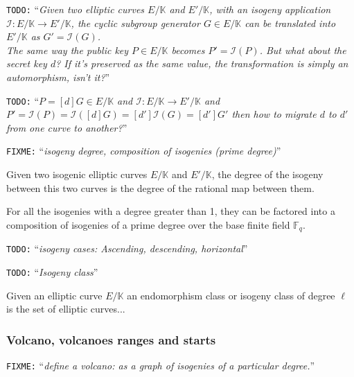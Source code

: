 \documentclass[10pt,a4paper,twoside]{llncs}
\newcommand{\todo}[1]{\texttt{\color{red}TODO:} ``\emph{#1}''}
\newcommand{\fixme}[1]{\texttt{\color{red}FIXME:} ``\emph{#1}''}
\newcommand{\Fq}{\ensuremath{\mathbb{F}_q}}%
\begin{document}
\todo{Given two elliptic curves $E/\mathbb{K}$ and $E'/\mathbb{K}$, with an isogeny application $\mathcal{I}: E/\mathbb{K} \rightarrow E'/\mathbb{K}$, the cyclic subgroup generator $G \in E/\mathbb{K}$ can be \emph{translated} into $E'/\mathbb{K}$ as $G'=\mathcal{I}\left(G\right)$.\\ The same way the public key $P \in E/\mathbb{K}$ becomes $P'=\mathcal{I}\left(P\right)$. But what about the secret key $d$? If it's preserved as the same value, the transformation is simply an automorphism, isn't it?}

\todo{$P=[d]G \in E/\mathbb{K}$ and $\mathcal{I}: E/\mathbb{K} \rightarrow E'/\mathbb{K}$ and  $P'=\mathcal{I}\left(P\right)=\mathcal{I}\left([d]G\right)=[d']\mathcal{I}\left(G\right)=[d']G'$ then how to \emph{migrate} $d$ to $d'$ from one curve to another?}

\fixme{isogeny degree, composition of isogenies (prime degree)}

\begin{definition}\label{def:iso_degree}
 Given two isogenic elliptic curves $E/\mathbb{K}$ and $E'/\mathbb{K}$, the degree of the isogeny between this two curves is the degree of the rational map between them.
\end{definition}

For all the isogenies with a degree greater than 1, they can be factored into a composition of isogenies of a prime degree over the base finite field \Fq.

\todo{isogeny cases: Ascending, descending, horizontal}

\todo{Isogeny class}
\begin{definition}\label{def_iso_class}
 Given an elliptic curve $E/\mathbb{K}$ an endomorphism class or isogeny class of degree $\ell$ is the set of elliptic curves... 
\end{definition}

\subsubsection{Volcano, volcanoes ranges and starts \label{sec:volcano}}

\fixme{define a volcano: as a graph of isogenies of a particular degree.}
\end{document}
